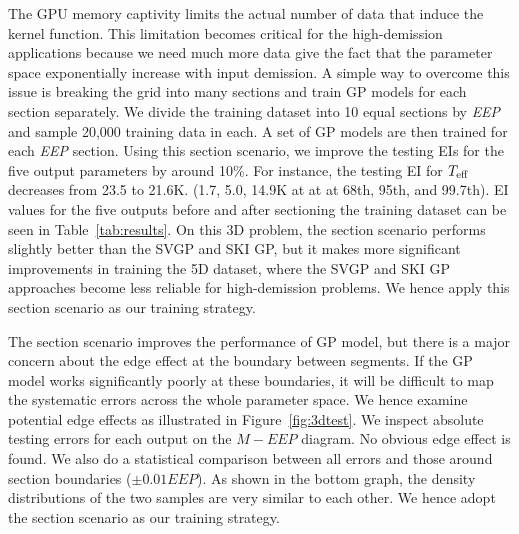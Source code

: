 The GPU memory captivity limits the actual number of data that induce the kernel function. This limitation becomes critical for the high-demission applications because we need much more data give the fact that the parameter space exponentially increase with input demission. 
%
A simple way to overcome this issue is breaking the grid into many sections and train GP models for each section separately. 
We divide the training dataset into 10 equal sections by {\it EEP} and sample 20,000 training data in each. A set of GP models are then trained for each {\it EEP} section. 
%
Using this section scenario, we improve the testing EIs for the five output parameters by around 10\%. For instance, the testing EI for $T_{\rm eff}$ decreases from 23.5 to 21.6K. (1.7, 5.0, 14.9K at at  at 68th, 95th, and 99.7th). EI values for the five outputs before and after sectioning the training dataset can be seen in Table~\ref{tab:results}.  On this 3D problem, the section scenario performs slightly better than the SVGP and SKI GP, but it makes more significant improvements in training the 5D dataset, where the SVGP and SKI GP approaches become less reliable for high-demission problems. 
We hence apply this section scenario as our training strategy. 
 
The section scenario improves the performance of GP model, but there is a major concern about the edge effect at the boundary between segments. If the GP model works significantly poorly at these boundaries, it will be difficult to map the systematic errors across the whole parameter space. We hence examine potential edge effects as illustrated in Figure~\ref{fig:3dtest}. We inspect absolute testing errors for each output on the $M-EEP$ diagram. No obvious edge effect is found. We also do a statistical comparison between all errors and those around section boundaries ($\pm0.01EEP$). As shown in the bottom graph, the density distributions of the two samples are very similar to each other. We hence adopt the section scenario as our training strategy. 




